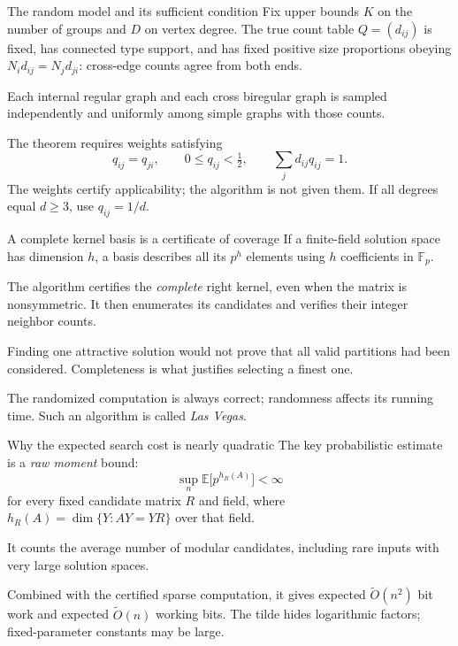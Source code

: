 \documentclass[aspectratio=169,11pt]{beamer}
\newcommand{\E}{\mathbb E}
\newcommand{\F}{\mathbb F}
\begin{document}
\begin{frame}{The random model and its sufficient condition}
Fix upper bounds $K$ on the number of groups and $D$ on vertex degree.
The true count table $Q=(d_{ij})$ is fixed, has connected type support,
and has fixed positive size proportions obeying
$N_i d_{ij}=N_j d_{ji}$: cross-edge counts agree from both ends.

Each internal regular graph and each cross biregular graph is sampled
independently and uniformly among simple graphs with those counts.

The theorem requires weights satisfying
\[
 q_{ij}=q_{ji},\qquad 0\le q_{ij}<\tfrac12,\qquad
 \sum_jd_{ij}q_{ij}=1.
\]
The weights certify applicability; the algorithm is not given them.
If all degrees equal $d\ge3$, use $q_{ij}=1/d$.
\end{frame}

\begin{frame}{A complete kernel basis is a certificate of coverage}
If a finite-field solution space has dimension $h$, a basis describes
all its $p^h$ elements using $h$ coefficients in $\F_p$.

The algorithm certifies the \emph{complete} right kernel, even when the
matrix is nonsymmetric. It then enumerates its candidates and verifies
their integer neighbor counts.

Finding one attractive solution would not prove that all valid partitions
had been considered. Completeness is what justifies selecting a finest one.

The randomized computation is always correct; randomness affects its
running time. Such an algorithm is called \emph{Las Vegas}.
\end{frame}

\begin{frame}{Why the expected search cost is nearly quadratic}
The key probabilistic estimate is a \emph{raw moment} bound:
\[
 \sup_n\E\big[p^{h_R(A)}\big]<\infty
\]
for every fixed candidate matrix $R$ and field, where
$h_R(A)=\dim\{Y:AY=YR\}$ over that field.

It counts the average number of modular candidates, including rare
inputs with very large solution spaces.

Combined with the certified sparse computation, it gives expected
$\widetilde O(n^2)$ bit work and expected $\widetilde O(n)$ working bits.
The tilde hides logarithmic factors; fixed-parameter constants may be large.
\end{frame}
\end{document}
